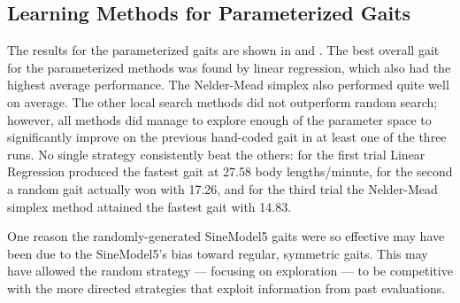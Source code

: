


\subsection{Learning Methods for Parameterized Gaits}


The results for the parameterized gaits are shown in
 and .  The best overall gait for
the parameterized methods was found by linear regression, which also
had the highest average performance. The Nelder-Mead simplex also
performed quite well on average.  The other local search methods did not
outperform random search; however, all methods did manage to explore
enough of the parameter space to significantly improve on the previous
hand-coded gait in at least one of the three runs.  No single strategy
consistently beat the others: for the first trial Linear Regression
produced the fastest gait at 27.58 body lengths/minute, for the second
a random gait actually won with 17.26, and for the
third trial the Nelder-Mead simplex method attained the fastest gait
with 14.83.

One reason the randomly-generated SineModel5 gaits were so effective
may have been due to the SineModel5's bias toward regular, symmetric
gaits.  This may have allowed the random strategy --- focusing on
exploration --- to be competitive with the more directed strategies
that exploit information from past evaluations.



% 
% 
% 


